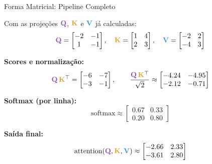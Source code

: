 \documentclass[aspectratio=169,xcolor=dvipsnames]{beamer}
\newcommand{\Qc}{\textcolor{qcolor}{\mathbf{Q}}}
\newcommand{\Kc}{\textcolor{kcolor}{\mathbf{K}}}
\newcommand{\Vc}{\textcolor{vcolor}{\mathbf{V}}}
\begin{document}
\begin{frame}[shrink=10]{Forma Matricial: Pipeline Completo}

Com as projeções $\Qc$, $\Kc$ e $\Vc$ já calculadas:
\[
\Qc = \begin{bmatrix} -2 & -1 \\ 1 & -1 \end{bmatrix}, \quad
\Kc = \begin{bmatrix} 1 & 4 \\ 2 & 3 \end{bmatrix}, \quad
\Vc = \begin{bmatrix} -2 & 2 \\ -4 & 3 \end{bmatrix}
\]

\vspace{6pt}

\textbf{Scores e normalização:}
\[
\Qc \, \Kc^{\top} = \begin{bmatrix} -6 & -7 \\ -3 & -1 \end{bmatrix}, \qquad
\frac{\Qc \, \Kc^{\top}}{\sqrt{2}} \approx \begin{bmatrix} -4.24 & -4.95 \\ -2.12 & -0.71 \end{bmatrix}
\]

\vspace{4pt}

\textbf{Softmax (por linha):}
\[
\mathrm{softmax} \approx \begin{bmatrix} 0.67 & 0.33 \\ 0.20 & 0.80 \end{bmatrix}
\]

\vspace{4pt}

\textbf{Saída final:}
\[
\mathrm{attention}(\Qc, \Kc, \Vc) \approx \begin{bmatrix} -2.66 & 2.33 \\ -3.61 & 2.80 \end{bmatrix}
\]

\end{frame}

\end{document}
